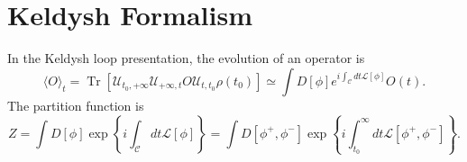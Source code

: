 \documentclass[aps,prb,superscriptaddress,nofootinbib]{revtex4}
\def \Tr{\operatorname{Tr}}
\begin{document}
\section{Keldysh Formalism}

In the Keldysh loop presentation, the evolution of an operator is
\begin{equation}
	\langle O\rangle_t = \Tr[\mathcal{U}_{t_0,+\infty}\mathcal{U}_{+\infty,t} O \mathcal{U}_{t,t_0}\rho(t_0)] \simeq \int D[\phi] e^{i\int_{\mathcal C} dt \mathcal L[\phi]} O(t).
\end{equation}
The partition function is
\begin{equation}
	Z = \int D[\phi] \exp\left\{i\int_{\mathcal C} dt \mathcal L[\phi]\right\}
	=  \int D[\phi^+,\phi^-] \exp\left\{i\int_{t_0}^\infty dt \mathcal L[\phi^+,\phi^-]\right\}.
\end{equation}
\end{document}
